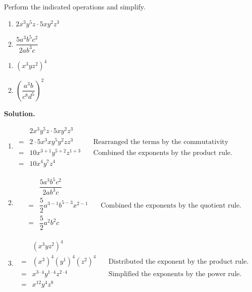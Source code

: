 \medskip

\begin{ex} \label{exponentreview2}  Perform the indicated operations and simplify.

\begin{multicols}{2}
\begin{enumerate}

\item $2 x^3 y^5 z \cdot 5 x y^2 z^3$
\item $ \dfrac{5 a^3 b^5 c^2}{2 a b^3 c}$

\setcounter{HW}{\value{enumi}}
\end{enumerate}
\end{multicols}

\begin{multicols}{2}
\begin{enumerate}

\setcounter{enumi}{\value{HW}}

\item $(x^3 y z^2)^4$
\item $\left( \dfrac{a^3 b}{c^8 d^5} \right)^2$

\end{enumerate}
\end{multicols}

{\bf Solution.}

\begin{enumerate}

\item \[
\begin{array}{cll}
& 2 x^3 y^5 z \cdot 5 x y^2 z^3 & \\
= & 2\cdot5 x^3 x y^5 y^2 z z^3 & \quad\text{Rearranged the terms by the commutativity property.}\\[8pt]
= & 10 x^{3+1} y^{5+2} z^{1+3} & \quad\text{Combined the exponents by the product rule.}\\[8pt]
= & 10 x^4 y^7 z^4 
\end{array}
\]

\item \[
\begin{array}{cll}
& \dfrac{5 a^3 b^5 c^2}{2 a b^3 c} & \\[8pt]
= & \dfrac{5}{2}a^{3-1} b^{5-3} x^{2-1}& \quad\text{Combined the exponents by the quotient rule.}\\[8pt]
= & \dfrac{5}{2} a^2 b^2 c   
\end{array}
\]

\item \[
\begin{array}{cll}
& (x^3 y z^2)^4 & \\[8pt]
= & (x^3)^4 (y^1)^4 (z^2)^4 & \quad\text{Distributed the exponent by the product rule.}\\[8pt]
= & x^{3\cdot 4} y^{1\cdot 4} z^{2\cdot 4} & \quad\text{Simplified the exponents by the power rule.}\\[8pt]
= & x^{12} y^4 z^8 
\end{array}
\]


\end{enumerate}
\end{ex}
